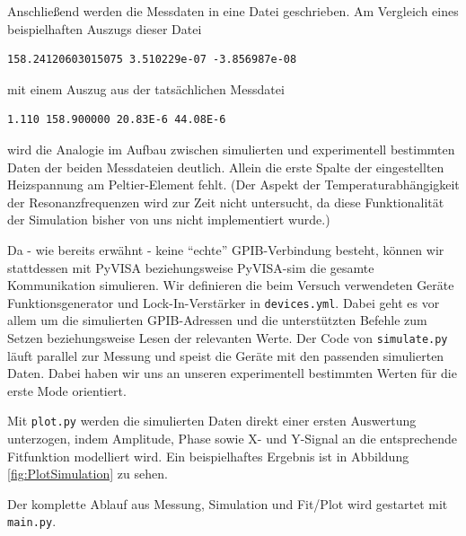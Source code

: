 Anschließend werden die Messdaten in eine Datei geschrieben. Am Vergleich eines beispielhaften Auszugs dieser Datei
\begin{small}
\begin{lstlisting}[xleftmargin=10mm,numbers=none]
158.24120603015075 3.510229e-07 -3.856987e-08
\end{lstlisting}
\end{small}

mit einem Auszug aus der tatsächlichen Messdatei
\begin{small}
\begin{lstlisting}[xleftmargin=10mm,numbers=none]
1.110 158.900000 20.83E-6 44.08E-6
\end{lstlisting}
\end{small}

wird die Analogie im Aufbau zwischen simulierten und experimentell bestimmten Daten der beiden Messdateien deutlich.
Allein die erste Spalte der eingestellten Heizspannung am Peltier-Element fehlt.
(Der Aspekt der Temperaturabhängigkeit der Resonanzfrequenzen wird zur Zeit nicht untersucht, da diese Funktionalität der Simulation bisher von uns nicht implementiert wurde.)

Da - wie bereits erwähnt - keine \enquote{echte} GPIB-Verbindung besteht, können wir stattdessen mit PyVISA beziehungsweise PyVISA-sim die gesamte Kommunikation simulieren.
Wir definieren die beim Versuch verwendeten Geräte Funktionsgenerator und Lock-In-Verstärker in \texttt{devices.yml}.
Dabei geht es vor allem um die simulierten GPIB-Adressen und die unterstützten Befehle zum Setzen beziehungsweise Lesen der relevanten Werte.
Der Code von \texttt{simulate.py} läuft parallel zur Messung und speist die Geräte mit den passenden simulierten Daten.
Dabei haben wir uns an unseren experimentell bestimmten Werten für die erste Mode orientiert.

Mit \texttt{plot.py} werden die simulierten Daten direkt einer ersten Auswertung unterzogen, indem Amplitude, Phase sowie X- und Y-Signal an die entsprechende Fitfunktion modelliert wird.
Ein beispielhaftes Ergebnis ist in Abbildung \ref{fig:PlotSimulation} zu sehen.

Der komplette Ablauf aus Messung, Simulation und Fit/Plot wird gestartet mit \texttt{main.py}.


